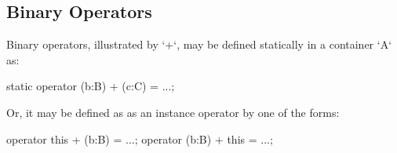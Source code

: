 



\subsection{Binary Operators}

Binary operators, illustrated by \xcd`+`, may be defined statically in a
container \xcd`A` as:
\begin{xten}
static operator (b:B) + (c:C) = ...;
\end{xten}
Or, it may be defined as  as an instance operator by one of the forms:
\begin{xten}
operator this + (b:B) = ...;
operator (b:B) + this = ...;
\end{xten}

